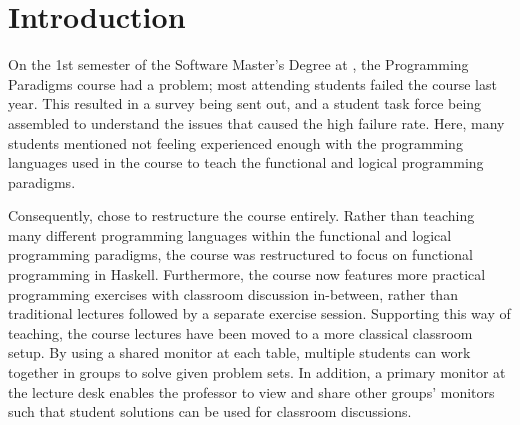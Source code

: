 \chapter{Introduction} \label{chap:introduction}
On the 1st semester of the Software Master’s Degree at \aau{}, the Programming Paradigms course had a problem; most attending students failed the course last year. 
This resulted in a survey being sent out, and a student task force being assembled to understand the issues that caused the high failure rate.
Here, many students mentioned not feeling experienced enough with the programming languages used in the course to teach the functional and logical programming paradigms.


Consequently, \aau{} chose to restructure the course entirely. 
Rather than teaching many different programming languages within the functional and logical programming paradigms, the course was restructured to focus on functional programming in Haskell.
Furthermore, the course now features more practical programming exercises with classroom discussion in-between, rather than traditional lectures followed by a separate exercise session.
Supporting this way of teaching, the course lectures have been moved to a more classical classroom setup.
By using a shared monitor at each table, multiple students can work together in groups to solve given problem sets.
In addition, a primary monitor at the lecture desk enables the professor to view and share other groups' monitors such that student solutions can be used for classroom discussions. 
